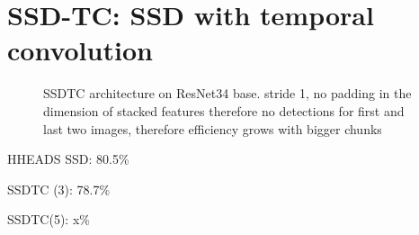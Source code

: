\section{SSD-TC: SSD with temporal convolution}
\begin{figure}
    \centering
    \ssdtc
    \caption[SSDTC architecture]{SSDTC architecture on ResNet34 base. stride 1, no padding in the dimension of stacked features therefore no detections for first and last two images, therefore efficiency grows with bigger chunks}
    \label{fig:ssdtc}
\end{figure}


HHEADS SSD: 80.5\%

SSDTC (3): 78.7\%

SSDTC(5): x\%
